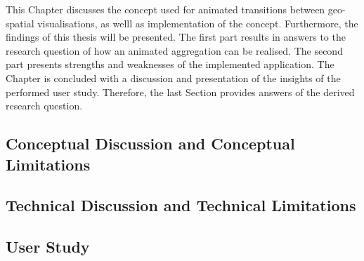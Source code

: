 This Chapter discusses the concept used for animated transitions between geo-spatial visualisations, as welll as implementation of the concept. Furthermore, the findings of this thesis will be presented. The first part results in answers to the research question of how an animated aggregation can be realised. The second part presents strengths and weaknesses of the implemented application.
The Chapter is concluded with a discussion and presentation of the insights of the performed user study. Therefore, the last Section provides answers of the derived research question.

\subsection{Conceptual Discussion and Conceptual Limitations}



\subsection{Technical Discussion and Technical Limitations}


\subsection{User Study}
\label{s:discussion-study}
